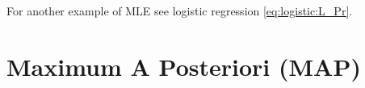 For another example of MLE see logistic regression \cref{eq:logistic:L_Pr}.

\section{Maximum A Posteriori (MAP)}
\label{stats:MAP}
